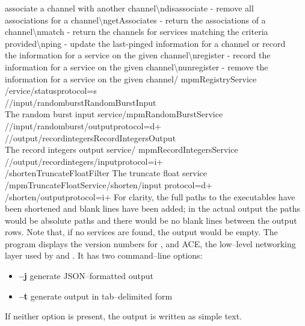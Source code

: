 associate a channel with another channel\textbackslash{}ndisassociate - remove all\\
associations for a channel\textbackslash{}ngetAssociates - return the associations of a\\
channel\textbackslash{}nmatch - return the channels for services matching the criteria\\
provided\textbackslash{}nping - update the last-pinged information for a channel or
record\\
the information for a service on the given channel\textbackslash{}nregister - record the\\
information for a service on the given channel\textbackslash{}nunregister - remove the\\
information for a service on the given channel\pseudotab\textellipsis/%
mpmRegistryService\pseudotwotabs\\
/\textdollar{}ervice/status\textbraceleft{}protocol=s\textbraceright\\

/\serviceName/input/randomburst\pseudotab{}RandomBurst\pseudotab{}Input\pseudotab\\
The random burst input service\pseudotwotabs\textellipsis/mpmRandomBurstService%
\pseudotwotabs\\
/\serviceName/input/randomburst/output\textbraceleft{}protocol=d+\textbraceright\\

/\serviceName/output/recordintegers\pseudotab{}RecordIntegers\pseudotab{}Output%
\pseudotab\\
The record integers output service\pseudotwotabs\textellipsis/%
mpmRecordIntegersService\pseudotab\\
/\serviceName/output/recordintegers/input\textbraceleft{}protocol=i+\textbraceright\\

/shorten\pseudotab{}TruncateFloat\pseudotab{}Filter\pseudotab{}%
The truncate float service\pseudotwotabs\\
\textellipsis/mpmTruncateFloatService\pseudotab{}/shorten/input\textbraceleft{}%
protocol=d+\textbraceright\pseudotab\\
/shorten/output\textbraceleft{}protocol=i+\textbraceright
\outputEnd{}
For clarity, the full paths to the executables have been shortened and blank lines have
been added; in the actual output the paths would be absolute paths and there would be no
blank lines between the output rows.
Note that, if no services are found, the output would be empty.
The program  displays the version numbers for \mplusm{}, \yarp{}
and ACE, the low--level networking layer used by \mplusm{} and \yarp{}.
It has two command--line options:
\begin{itemize}
\item \textbf{--j} generate JSON--formatted output
\item \textbf{--t} generate output in tab--delimited form
\end{itemize}
If neither option is present, the output is written as simple text.\\


